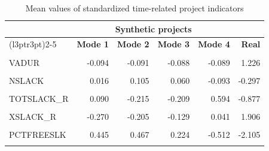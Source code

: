 \documentclass[preprint,
3p]{elsarticle} %
\begin{document}
\begin{table}[H]
\centering\centering
\caption{\label{tab:MEANS_TIME}Mean values of standardized time-related project indicators}
\centering
\fontsize{8}{10}\selectfont
\begin{tabular}[t]{lrrrrr}
\toprule
\multicolumn{1}{c}{ } & \multicolumn{4}{c}{Synthetic projects} & \multicolumn{1}{c}{ } \\
\cmidrule(l{3pt}r{3pt}){2-5}
\textbf{ } & \textbf{Mode 1} & \textbf{Mode 2} & \textbf{Mode 3} & \textbf{Mode 4} & \textbf{Real}\\
\midrule
\cellcolor{gray!10}{XDUR} & \cellcolor{gray!10}{-0.131} & \cellcolor{gray!10}{-0.102} & \cellcolor{gray!10}{-0.119} & \cellcolor{gray!10}{-0.203} & \cellcolor{gray!10}{1.880}\\
VADUR & -0.094 & -0.091 & -0.088 & -0.089 & 1.226\\
\cellcolor{gray!10}{MAXCPL} & \cellcolor{gray!10}{-0.173} & \cellcolor{gray!10}{-0.042} & \cellcolor{gray!10}{-0.057} & \cellcolor{gray!10}{-0.297} & \cellcolor{gray!10}{1.925}\\
NSLACK & 0.016 & 0.105 & 0.060 & -0.093 & -0.297\\
\cellcolor{gray!10}{PCTSLACK} & \cellcolor{gray!10}{0.014} & \cellcolor{gray!10}{0.259} & \cellcolor{gray!10}{0.116} & \cellcolor{gray!10}{-0.286} & \cellcolor{gray!10}{-0.347}\\
\addlinespace
TOTSLACK\_R & 0.090 & -0.215 & -0.209 & 0.594 & -0.877\\
\cellcolor{gray!10}{XSLACK} & \cellcolor{gray!10}{-0.159} & \cellcolor{gray!10}{-0.111} & \cellcolor{gray!10}{-0.104} & \cellcolor{gray!10}{-0.146} & \cellcolor{gray!10}{1.758}\\
XSLACK\_R & -0.270 & -0.205 & -0.129 & 0.041 & 1.906\\
\cellcolor{gray!10}{NFREESLK} & \cellcolor{gray!10}{0.290} & \cellcolor{gray!10}{0.305} & \cellcolor{gray!10}{0.157} & \cellcolor{gray!10}{-0.281} & \cellcolor{gray!10}{-1.591}\\
PCTFREESLK & 0.445 & 0.467 & 0.224 & -0.512 & -2.105\\
\addlinespace
\cellcolor{gray!10}{XFREESLK} & \cellcolor{gray!10}{-0.153} & \cellcolor{gray!10}{-0.029} & \cellcolor{gray!10}{-0.015} & \cellcolor{gray!10}{-0.148} & \cellcolor{gray!10}{1.164}\\
\bottomrule
\end{tabular}
\end{table}
\end{document}
